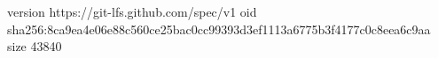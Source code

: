 version https://git-lfs.github.com/spec/v1
oid sha256:8ca9ea4e06e88c560ce25bac0cc99393d3ef1113a6775b3f4177c0c8eea6c9aa
size 43840
